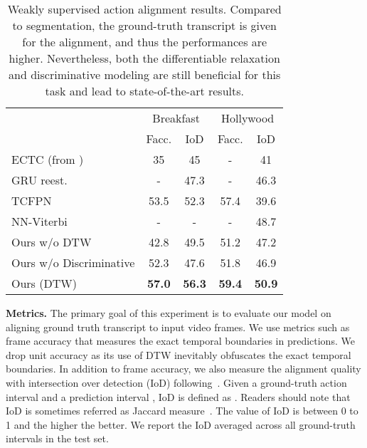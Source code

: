 \documentclass[10pt,twocolumn,letterpaper]{article}
\begin{document}
\begin{table}
\small
\begin{center}
\begin{tabular}{lcccc}
\toprule
& \multicolumn{2}{c}{Breakfast} & \multicolumn{2}{c}{Hollywood} \\
 & Facc.  & IoD & Facc. & IoD \\
\midrule
ECTC\cite{huang2016connectionist} (from \cite{ding2018weakly})  & 35  & 45 & - & 41 \\
GRU reest.\cite{richard2017weakly} & -  & 47.3 & - & 46.3 \\
TCFPN\cite{ding2018weakly} &53.5  & 52.3 & 57.4 &  39.6\\
NN-Viterbi\cite{richard2018neuralnetwork} & -  & - & - & 48.7\\
\hline
Ours w/o DTW  & 42.8 & 49.5 & 51.2 & 47.2\\
Ours w/o Discriminative  & 52.3 & 47.6 & 51.8 & 46.9\\
Ours (DTW) & {\bf 57.0} & {\bf 56.3} &{\bf 59.4} & {\bf 50.9}\\
\bottomrule
\end{tabular}
\end{center}
\caption{
Weakly supervised action alignment results. Compared to segmentation, the ground-truth transcript is given for the alignment, and thus the performances are higher. Nevertheless, both the differentiable relaxation and discriminative modeling are still beneficial for this task and lead to state-of-the-art results.
}
\vspace{-3mm}
\label{tab:aa}
\end{table}

{\noindent \bf  Metrics.} The primary goal of this experiment is to evaluate our model on aligning ground truth transcript to input video frames. We use metrics such as frame accuracy that measures the exact temporal boundaries in predictions. We drop unit accuracy as its use of DTW inevitably obfuscates the exact temporal boundaries. In addition to frame accuracy, we also measure the alignment quality with intersection over detection (IoD) following~\cite{bojanowski2014weakly}. Given a ground-truth action interval  and a prediction interval , IoD is defined as . Readers should note that IoD is sometimes referred as Jaccard measure~\cite{bojanowski2014weakly,richard2018neuralnetwork}. The value of IoD is between 0 to 1 and the higher the better. We report the IoD averaged across all ground-truth intervals in the test set. 
\end{document}
